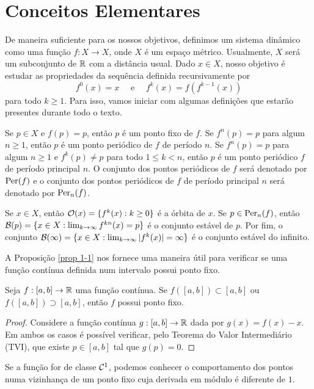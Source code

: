 \section{Conceitos Elementares}

De maneira suficiente para os nossos objetivos, definimos um sistema dinâmico como uma função $f: X \to X$, onde $X$ é um espaço métrico.
Usualmente, $X$ será um subconjunto de $\mathbb{R}$ com a distância usual.
Dado $x \in X$, nosso objetivo é estudar as propriedades da sequência definida recursivamente por
$$f^0(x) = x \quad \text{ e } \quad f^k(x) = f(f^{k-1}(x))$$
para todo $k \geq 1$. Para isso, vamos iniciar com algumas definições que estarão presentes durante todo o texto.

Se $p \in X$ e $f(p) = p$, então $p$ é um ponto fixo de $f$.
Se $f^n(p) = p$ para algum $n \geq 1$, então $p$ é um ponto periódico de $f$ de período $n$.
Se $f^n(p) = p$ para algum $n \geq 1$ e $f^k(p) \neq p$ para todo $1 \leq k < n$, então $p$ é um ponto periódico $f$ de período principal $n$.
O conjunto dos pontos periódicos de $f$ será denotado por $\operatorname{Per}(f)$ e o conjunto dos pontos periódicos de $f$ de período principal $n$ será denotado por $\operatorname{Per}_n(f)$.

Se $x \in X$, então $\mathcal{O}(x) = \lbrace f^k(x) : k \geq 0 \rbrace$ é a órbita de $x$.
Se $p \in \operatorname{Per}_n(f)$, então $\mathcal{B}(p) = \lbrace x \in  X: \lim_{k \to \infty} f^{kn}(x) = p \rbrace$ é o conjunto estável de $p$.
Por fim, o conjunto $\mathcal{B}(\infty) = \lbrace x \in  X: \lim_{k \to \infty} |f^k(x)| = \infty \rbrace$ é o conjunto estável do infinito.

A Proposição \ref{prop 1-1} nos fornece uma maneira útil para verificar se uma função contínua definida num intervalo possui ponto fixo.

\begin{proposition}\label{prop 1-1}
Seja $f: [a, b] \to \mathbb{R}$ uma função contínua. Se $f([a, b]) \subset [a, b]$ ou $f([a, b]) \supset [a, b]$, então $f$ possui ponto fixo.
\end{proposition}

\begin{proof}
Considere a função contínua $g: [a, b] \to \mathbb{R}$ dada por $g(x) = f(x) - x$. Em ambos os casos é possível verificar, pelo Teorema do Valor Intermediário (TVI), que existe $p \in [a, b]$ tal que $g(p) = 0$.
\end{proof}

Se a função for de classe $\mathcal{C}^1$, podemos conhecer o comportamento dos pontos numa vizinhança de um ponto fixo cuja derivada em módulo é diferente de $1$.

